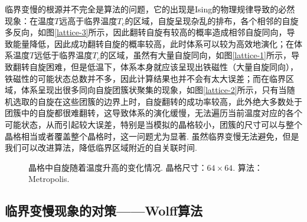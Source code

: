 \documentclass[UTF8,10pt,a4paper]{article}
\theoremstyle{Problem}
\theoremstyle{Solution}
\begin{document}
临界变慢的根源并不完全是算法的问题，它的出现是Ising的物理规律导致的必然现象：在温度$T$远高于临界温度$T_c$的区域，自旋呈现杂乱的排布，各个相邻的自旋多反向，如图\ref{lattice-3}所示，因此翻转自旋有较高的概率造成相邻自旋同向，导致能量降低，因此成功翻转自旋的概率较高，此时体系可以较为高效地演化；在体系温度$T$远低于临界温度$T_c$的区域，虽然有大量自旋同向，如图\ref{lattice-1}所示，导致翻转自旋困难，但是低温下，体系本身就应该呈现出铁磁性（大量自旋同向），铁磁性的可能状态总数并不多，因此计算结果也并不会有太大误差；而在临界区域，体系呈现出很多同向自旋团簇状聚集的现象，如图\ref{lattice-2}所示，只有当随机选取的自旋在这些团簇的边界上时，自旋翻转的成功率较高，此外绝大多数处于团簇中的自旋都很难翻转，这导致体系的演化缓慢，无法遍历当前温度对应的各个可能状态，从而引起较大误差，特别是当模拟的晶格较小，团簇的尺寸可以与整个晶格相当或者覆盖整个晶格时，这一问题尤为显著. 虽然临界变慢无法避免，但是我们可以改进算法，降低临界区域附近的自关联时间.
\begin{figure}[ht]
    \centering
    \caption{晶格中自旋随着温度升高的变化情况. 晶格尺寸：$64\times 64$. 算法：Metropolis.}
    \label{lattice}
\end{figure}

\subsection{临界变慢现象的对策——Wolff算法}
\end{document}
